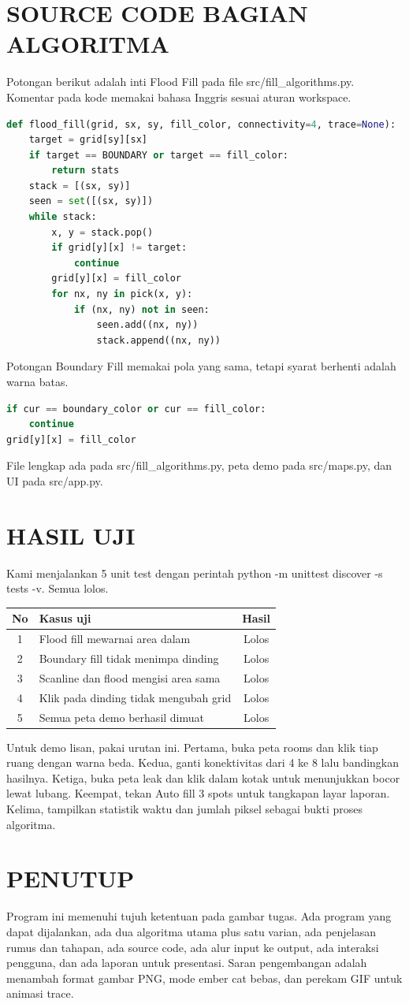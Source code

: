 ﻿\documentclass[12pt,a4paper]{article}
\begin{document}
\section{SOURCE CODE BAGIAN ALGORITMA}
Potongan berikut adalah inti Flood Fill pada file src/fill\_algorithms.py. Komentar pada kode memakai bahasa Inggris sesuai aturan workspace.
\begin{lstlisting}[language=Python]
def flood_fill(grid, sx, sy, fill_color, connectivity=4, trace=None):
    target = grid[sy][sx]
    if target == BOUNDARY or target == fill_color:
        return stats
    stack = [(sx, sy)]
    seen = set([(sx, sy)])
    while stack:
        x, y = stack.pop()
        if grid[y][x] != target:
            continue
        grid[y][x] = fill_color
        for nx, ny in pick(x, y):
            if (nx, ny) not in seen:
                seen.add((nx, ny))
                stack.append((nx, ny))
\end{lstlisting}
Potongan Boundary Fill memakai pola yang sama, tetapi syarat berhenti adalah warna batas.
\begin{lstlisting}[language=Python]
if cur == boundary_color or cur == fill_color:
    continue
grid[y][x] = fill_color
\end{lstlisting}
File lengkap ada pada src/fill\_algorithms.py, peta demo pada src/maps.py, dan UI pada src/app.py.
\section{HASIL UJI}
Kami menjalankan 5 unit test dengan perintah python -m unittest discover -s tests -v. Semua lolos.
\begin{center}
\begin{tabular}{|c|l|c|}
\hline
No & Kasus uji & Hasil \\
\hline
1 & Flood fill mewarnai area dalam & Lolos \\
\hline
2 & Boundary fill tidak menimpa dinding & Lolos \\
\hline
3 & Scanline dan flood mengisi area sama & Lolos \\
\hline
4 & Klik pada dinding tidak mengubah grid & Lolos \\
\hline
5 & Semua peta demo berhasil dimuat & Lolos \\
\hline
\end{tabular}
\end{center}
Untuk demo lisan, pakai urutan ini. Pertama, buka peta rooms dan klik tiap ruang dengan warna beda. Kedua, ganti konektivitas dari 4 ke 8 lalu bandingkan hasilnya. Ketiga, buka peta leak dan klik dalam kotak untuk menunjukkan bocor lewat lubang. Keempat, tekan Auto fill 3 spots untuk tangkapan layar laporan. Kelima, tampilkan statistik waktu dan jumlah piksel sebagai bukti proses algoritma.
\section{PENUTUP}
Program ini memenuhi tujuh ketentuan pada gambar tugas. Ada program yang dapat dijalankan, ada dua algoritma utama plus satu varian, ada penjelasan rumus dan tahapan, ada source code, ada alur input ke output, ada interaksi pengguna, dan ada laporan untuk presentasi. Saran pengembangan adalah menambah format gambar PNG, mode ember cat bebas, dan perekam GIF untuk animasi trace.
\end{document}
